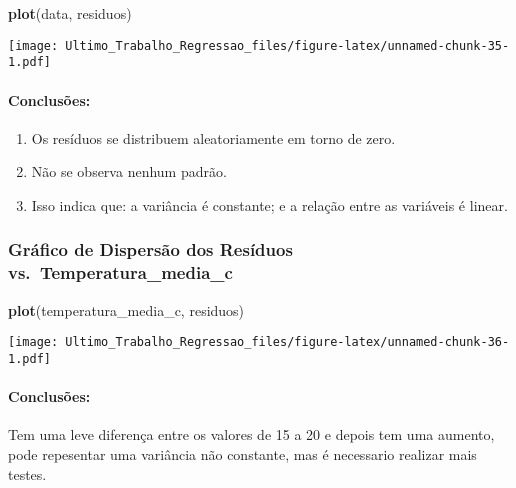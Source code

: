 \documentclass[
]{article}
\newenvironment{Shaded}{\begin{snugshade}}{\end{snugshade}}
\newcommand{\FunctionTok}[1]{\textcolor[rgb]{0.13,0.29,0.53}{\textbf{#1}}}
\newcommand{\NormalTok}[1]{#1}
\providecommand{\tightlist}{%
  \setlength{\itemsep}{0pt}\setlength{\parskip}{0pt}}
\begin{document}
\begin{Shaded}
\begin{Highlighting}[]
\FunctionTok{plot}\NormalTok{(data, residuos)}
\end{Highlighting}
\end{Shaded}

\texttt{[image: Ultimo\_Trabalho\_Regressao\_files/figure-latex/unnamed-chunk-35-1.pdf]}

\hypertarget{conclusuxf5es-1}{%
\paragraph{Conclusões:}\label{conclusuxf5es-1}}

\begin{enumerate}
\def\labelenumi{\arabic{enumi}.}
\tightlist
\item
  Os resíduos se distribuem aleatoriamente em torno de zero.
\item
  Não se observa nenhum padrão.
\item
  Isso indica que: a variância é constante; e a relação entre as
  variáveis é linear.
\end{enumerate}

\hypertarget{gruxe1fico-de-dispersuxe3o-dos-resuxedduos-vs.-temperatura_media_c}{%
\subsubsection{Gráfico de Dispersão dos Resíduos
vs.~Temperatura\_media\_c}\label{gruxe1fico-de-dispersuxe3o-dos-resuxedduos-vs.-temperatura_media_c}}

\begin{Shaded}
\begin{Highlighting}[]
\FunctionTok{plot}\NormalTok{(temperatura\_media\_c, residuos)}
\end{Highlighting}
\end{Shaded}

\texttt{[image: Ultimo\_Trabalho\_Regressao\_files/figure-latex/unnamed-chunk-36-1.pdf]}

\hypertarget{conclusuxf5es-2}{%
\paragraph{Conclusões:}\label{conclusuxf5es-2}}

Tem uma leve diferença entre os valores de 15 a 20 e depois tem uma
aumento, pode repesentar uma variância não constante, mas é necessario
realizar mais testes.
\end{document}
